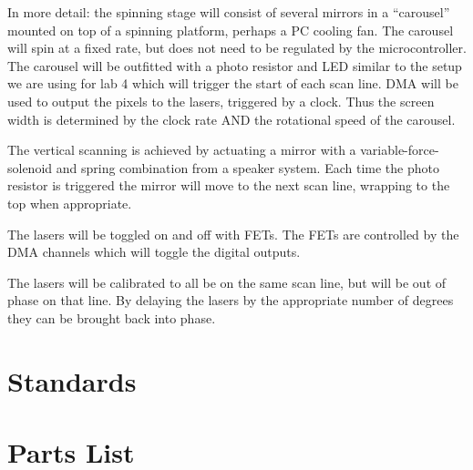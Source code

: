 \documentclass[10pt]{article}
\begin{document}
In more detail: the spinning stage will consist of several mirrors in a ``carousel'' mounted on top of a spinning platform, perhaps a PC cooling fan.
The carousel will spin at a fixed rate, but does not need to be regulated by the microcontroller.
The carousel will be outfitted with a photo resistor and LED similar to the setup we are using for lab 4 which will trigger the start of each scan line.
DMA will be used to output the pixels to the lasers, triggered by a clock.
Thus the screen width is determined by the clock rate AND the rotational speed of the carousel.

The vertical scanning is achieved by actuating a mirror with a variable-force-solenoid and spring combination from a speaker system.
Each time the photo resistor is triggered the mirror will move to the next scan line, wrapping to the top when appropriate.

The lasers will be toggled on and off with FETs.
The FETs are controlled by the DMA channels which will toggle the digital outputs.

The lasers will be calibrated to all be on the same scan line, but will be out of phase on that line.
By delaying the lasers by the appropriate number of degrees they can be brought back into phase.

\section{Standards}

\section{Parts List}
\end{document}
